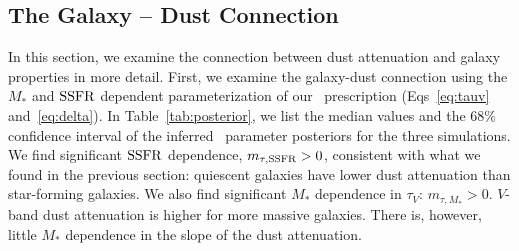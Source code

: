 \subsection{The Galaxy -- Dust Connection}  
In this section, we examine the connection between dust attenuation and galaxy
properties in more detail. 
First, we examine the galaxy-dust connection using the $M_*$ and ${\rm SSFR}$
dependent parameterization of our
\eda~prescription (Eqs~\ref{eq:tauv} and~\ref{eq:delta}).
In Table~\ref{tab:posterior}, we list the median values and the 68\%
confidence interval of the inferred \eda~parameter posteriors for the 
three simulations. 
We find significant ${\rm SSFR}$ dependence, $m_{\tau,{\rm SSFR}} > 0$, consistent with
what we found in the previous section: quiescent galaxies have lower dust
attenuation than star-forming galaxies.
We also find significant $M_*$ dependence in $\tau_V$: $m_{\tau,M_*} > 0$.
$V$-band dust attenuation is higher for more massive galaxies.  
There is, however, little $M_*$ dependence in the slope of the dust
attenuation.

